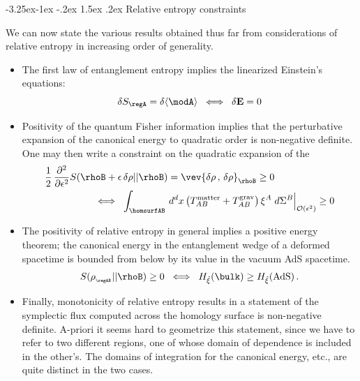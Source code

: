 \documentclass[12pt,openany]{book}
\makeatletter
\renewcommand\subsection{\@startsection{subsection}{2}{\z@}%
                                     {-3.25ex\@plus -1ex \@minus -.2ex}%
                                     {1.5ex \@plus .2ex}%
                                     {\normalfont\bfseries}}
\makeatother
\begin{document}
\subsection{Relative entropy constraints}
\label{sec:cerel}

We can now state the various results obtained thus far from considerations of relative entropy in increasing order of generality.
\begin{itemize}
\item The first law of entanglement entropy implies the linearized Einstein's equations:
%
\begin{equation}
\delta S_\regA = \delta \langle \modA \rangle  \;\; \Longleftrightarrow \;\; \delta \mathbf{E} = 0
\end{equation}
%
\item Positivity of the quantum Fisher information implies that  the perturbative expansion of the canonical energy to quadratic order is non-negative definite. One may then write a constraint on the quadratic expansion of the
%
\begin{equation}
\begin{split}
\frac{1}{2}\, \frac{\partial^2}{\partial \epsilon^2}
& S( \rhoB +\epsilon\, \delta \rho || \rhoB ) =
\vev{\delta \rho\,,\, \delta \rho}_{\rhoB }  \geq 0  \\
&\qquad  \;\; \Longleftrightarrow \;\;
  \int_{\homsurfAB} \, d^dx \left( T_{AB}^\text{matter} + T_{AB}^\text{grav} \right)\xi^A \; d\Sigma^B  \Big|_{{\cal O}(\epsilon^2) }
 \geq 0
\end{split}
\label{eq:pocanquad}
\end{equation}
\item The positivity of relative entropy in general implies a positive energy theorem; the canonical energy in the entanglement wedge of a deformed spacetime is bounded from below by its value in the vacuum AdS spacetime.
%
\begin{equation}
S(\rho_{_{\regAB}} || \rhoB ) \geq 0  \;\; \Longleftrightarrow \;\;
 H_{\hat{\xi}}(\bulk) \geq H_{\hat{\xi}}(\text{AdS}) \,.
\label{eq:poscan}
\end{equation}
%
\item Finally, monotonicity of relative entropy results in a statement of  the symplectic flux computed across the homology surface is non-negative definite. A-priori it seems hard to geometrize this statement, since we have to refer to two different regions, one of whose domain of dependence  is included in the other's. The domains of integration for the canonical energy, etc., are quite distinct in the two cases.


\end{itemize}
\end{document}
